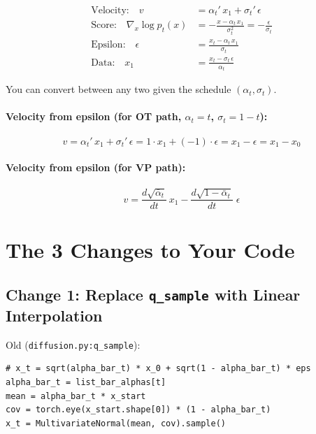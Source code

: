 \documentclass[11pt, a4paper]{article}
\newcommand{\alphabar}{\bar{\alpha}}
\begin{document}
\begin{align}
  \label{eq:conversions}
  \text{Velocity:} \quad
    v &= \alpha_t'\, x_1 + \sigma_t'\, \epsilon \\[0.5em]
  \text{Score:} \quad
    \nabla_x \log p_t(x) &= -\frac{x - \alpha_t\, x_1}{\sigma_t^2}
    = -\frac{\epsilon}{\sigma_t} \\[0.5em]
  \text{Epsilon:} \quad
    \epsilon &= \frac{x_t - \alpha_t\, x_1}{\sigma_t} \\[0.5em]
  \text{Data:} \quad
    x_1 &= \frac{x_t - \sigma_t\, \epsilon}{\alpha_t}
\end{align}

You can convert between any two given the schedule $(\alpha_t, \sigma_t)$.

\paragraph{Velocity from epsilon (for OT path, $\alpha_t = t$, $\sigma_t = 1-t$):}
\begin{equation}
  v = \alpha_t'\, x_1 + \sigma_t'\, \epsilon
    = 1 \cdot x_1 + (-1) \cdot \epsilon
    = x_1 - \epsilon = x_1 - x_0
\end{equation}

\paragraph{Velocity from epsilon (for VP path):}
\begin{equation}
  v = \frac{d\sqrt{\alphabar_t}}{dt}\, x_1
    - \frac{d\sqrt{1-\alphabar_t}}{dt}\;\epsilon
\end{equation}

\section{The 3 Changes to Your Code}
\label{sec:code-changes}

\subsection{Change 1: Replace \texttt{q\_sample} with Linear Interpolation}

\begin{ddpmbox}
\vspace{-0.5em}
Old (\texttt{diffusion.py:q\_sample}):
\begin{lstlisting}
# x_t = sqrt(alpha_bar_t) * x_0 + sqrt(1 - alpha_bar_t) * eps
alpha_bar_t = list_bar_alphas[t]
mean = alpha_bar_t * x_start
cov = torch.eye(x_start.shape[0]) * (1 - alpha_bar_t)
x_t = MultivariateNormal(mean, cov).sample()
\end{lstlisting}
\end{ddpmbox}
\end{document}
